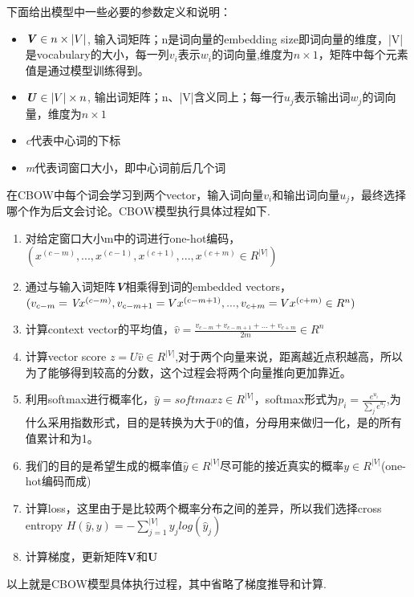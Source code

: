 \documentclass[twoside,nofonts,fancyhdr,openany,UTF8]{ctexbook}
\begin{document}
下面给出模型中一些必要的参数定义和说明：
\begin{itemize}
\item $\textbf{\emph{V}}\in{n \times |{V}|}$, 输入词矩阵；n是词向量的embedding size即词向量的维度，|V|是vocabulary的大小，每一列\emph{$v_{i}$}表示$w_{i}$的词向量,维度为$n \times 1$，矩阵中每个元素值是通过模型训练得到。
\item $\textbf{\emph{U}} \in{|V| \times n}$, 输出词矩阵；n、|V|含义同上；每一行\emph{$u_{j}$}表示输出词\emph{$w_j$}的词向量，维度为$n \times 1$
\item \emph{c}代表中心词的下标
\item \emph{m}代表词窗口大小，即中心词前后几个词
\end{itemize}
在CBOW中每个词会学习到两个vector，输入词向量$v_i$和输出词向量$u_j$，最终选择哪个作为后文会讨论。CBOW模型执行具体过程如下.
\begin{enumerate}
\item 对给定窗口大小m中的词进行one-hot编码，$(x^{(c-m)},...,x^{(c-1)},x^{(c+1)},...,x^{(c+m)}\in R^{|V|})$
\item 通过与输入词矩阵\textbf{\emph{V}}相乘得到词的embedded vectors，$(v_{c-m}=\emph{V}x^{(c-m)}, v_{c-m+1}=Vx^{(c-m+1)},...,v_{c+m}=Vx^{(c+m)} \in R^{n})$
\item 计算context vector的平均值，$\widehat{v}=\frac{v_{c-m}+v_{c-m+1}+...+v_{c+m}}{2m} \in R^{n}$
\item 计算vector score $z=U\widehat{v} \in R^{|V|}$,对于两个向量来说，距离越近点积越高，所以为了能够得到较高的分数，这个过程会将两个向量推向更加靠近。
\item 利用softmax进行概率化，$\widehat{y}=softmax{z} \in R^{|V|}$，softmax形式为$p_{i}=\frac{e^{u_i}}{\sum_{j}{}e^{u_j}}$,为什么采用指数形式，目的是转换为大于0的值，分母用来做归一化，是的所有值累计和为1。
\item 我们的目的是希望生成的概率值$\widehat{y} \in R^{|V|}$尽可能的接近真实的概率$y \in R^{|V|}$(one-hot编码而成)
\item 计算loss，这里由于是比较两个概率分布之间的差异，所以我们选择cross entropy $H(\widehat{y}, y)= - \sum_{j=1}^{|V|}y_{j}log(\widehat{y}_{j})$
\item 计算梯度，更新矩阵\textbf{V}和\textbf{U}
\end{enumerate}

以上就是CBOW模型具体执行过程，其中省略了梯度推导和计算.



\end{document}
